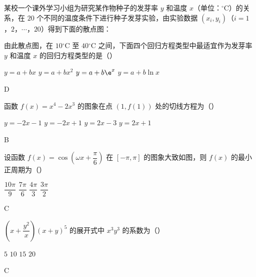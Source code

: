 \begin{problem}
某校一个课外学习小组为研究某作物种子的发芽率 \(y\) 和温度 \(x\)（单位：\({}^\circ\mathrm{C}\)）的关系，在 \(20\) 个不同的温度条件下进行种子发芽实验，由实验数据 \(\left( x_i,y_i \right)\)（\(i=1\)，\(2\)，\(\cdots\)，\(20\)）得到下面的散点图：


由此散点图，在 \(10{}^\circ\mathrm{C}\) 至 \(40{}^\circ\mathrm{C}\) 之间，下面四个回归方程类型中最适宜作为发芽率 \(y\) 和温度 \(x\) 的回归方程类型的是（\quad）

\choices
    {\(y=a+bx\)}
    {\(y=a+bx^2\)}
    {\(y=a+b\e^x\)}
    {\(y=a+b\ln x\)}

\begin{answer}
D
\end{answer}
\end{problem}

\begin{problem}
函数 \(f(x)=x^4-2x^3\) 的图象在点 \(\left( 1,f\left( 1 \right) \right)\) 处的切线方程为（\quad）

\choices
    {\(y=-2x-1\)}
    {\(y=-2x+1\)}
    {\(y=2x-3\)}
    {\(y=2x+1\)}

\begin{answer}
B
\end{answer}
\end{problem}

\begin{problem}
设函数 \(f(x)=\cos\left( \omega x+\dfrac{\pi}{6} \right)\) 在 \([-\pi,\pi]\) 的图象大致如图，则 \(f(x)\) 的最小正周期为（\quad）


\choices
    {\(\dfrac{10\pi}{9}\)}
    {\(\dfrac{7\pi}{6}\)}
    {\(\dfrac{4\pi}{3}\)}
    {\(\dfrac{3\pi}{2}\)}

\begin{answer}
C
\end{answer}
\end{problem}

\begin{problem}
\(\left( x+\dfrac{y^2}{x} \right)\left( x+y \right)^5\) 的展开式中 \(x^3y^3\) 的系数为（\quad）

\choices
    {\(5\)}
    {\(10\)}
    {\(15\)}
    {\(20\)}

\begin{answer}
C
\end{answer}
\end{problem}

